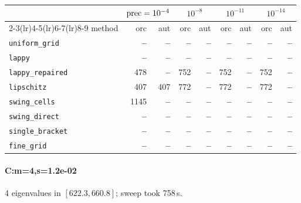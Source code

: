 \begin{center}
\small
\begin{tabular}{lrrrrrrrr}
\toprule
& \multicolumn{2}{c}{$\mathrm{prec}=10^{-4}$} & \multicolumn{2}{c}{$10^{-8}$} & \multicolumn{2}{c}{$10^{-11}$} & \multicolumn{2}{c}{$10^{-14}$} \\
\cmidrule(lr){2-3}\cmidrule(lr){4-5}\cmidrule(lr){6-7}\cmidrule(lr){8-9}
method & orc & aut & orc & aut & orc & aut & orc & aut \\
\midrule
\texttt{uniform\_grid} & \textbf{--} & \textbf{--} & \textbf{--} & \textbf{--} & \textbf{--} & \textbf{--} & \textbf{--} & \textbf{--} \\
\texttt{lappy} & \textbf{--} & \textbf{--} & \textbf{--} & \textbf{--} & \textbf{--} & \textbf{--} & \textbf{--} & \textbf{--} \\
\texttt{lappy\_repaired} & 478 & \textbf{--} & 752 & \textbf{--} & 752 & \textbf{--} & 752 & \textbf{--} \\
\texttt{lipschitz} & 407 & 407 & 772 & \textbf{--} & 772 & \textbf{--} & 772 & \textbf{--} \\
\texttt{swing\_cells} & 1145 & \textbf{--} & \textbf{--} & \textbf{--} & \textbf{--} & \textbf{--} & \textbf{--} & \textbf{--} \\
\texttt{swing\_direct} & \textbf{--} & \textbf{--} & \textbf{--} & \textbf{--} & \textbf{--} & \textbf{--} & \textbf{--} & \textbf{--} \\
\midrule
\texttt{single\_bracket} & \textbf{--} & \textbf{--} & \textbf{--} & \textbf{--} & \textbf{--} & \textbf{--} & \textbf{--} & \textbf{--} \\
\texttt{fine\_grid} & \textbf{--} & \textbf{--} & \textbf{--} & \textbf{--} & \textbf{--} & \textbf{--} & \textbf{--} & \textbf{--} \\
\bottomrule
\end{tabular}
\end{center}

\paragraph{C:m=4,s=1.2e-02} 4 eigenvalues in $[622.3, 660.8]$; sweep took 758\,s.

